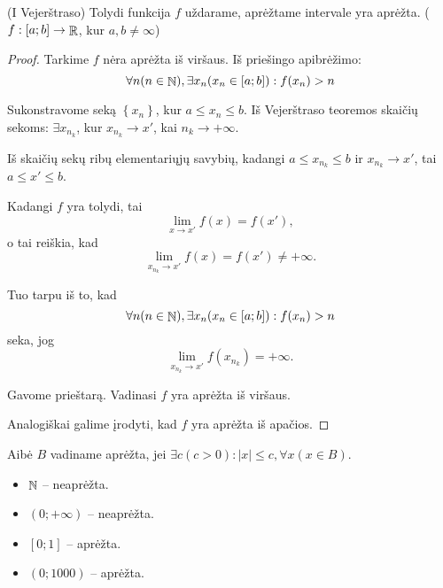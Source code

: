 \begin{prop}
  (I Vejerštraso) Tolydi funkcija $f$ uždarame, aprėžtame intervale yra
  aprėžta. ($f : [a;b] \to \mathop{\mathbb{R}}$, kur $a, b \neq \infty$)

  \begin{proof}
    Tarkime $f$ nėra aprėžta iš viršaus. Iš priešingo apibrėžimo:
    \begin{equation*}
      \forall n (n \in \mathop{\mathbb{N}}), \exists x_{n} (x_{n} \in [a;b]) :
        f(x_{n}) > n
    \end{equation*}

    Sukonstravome seką $\left\{ x_{n} \right\}$, kur 
    $a \leq x_{n} \leq b$. Iš Vejerštraso teoremos skaičių sekoms:
    $ \exists x_{n_{k}}$, kur $x_{n_{k}} \to x'$, 
    kai $n_{k} \to +\infty$.

    Iš skaičių sekų ribų elementariųjų savybių, kadangi 
    $a \leq x_{n_{k}} \leq b$ ir $x_{n_{k}} \to x'$, tai 
    $a \leq x' \leq b$.

    Kadangi $f$ yra tolydi, tai 
    \begin{equation*}
      \lim _{x \to x'} f(x) = f(x'),
    \end{equation*}
    o tai reiškia, kad
    \begin{equation*}
      \lim _{x_{n_{k}} \to x'} f(x) = f(x') \neq +\infty.
    \end{equation*}

    Tuo tarpu iš to, kad
    \begin{equation*}
      \forall n (n \in \mathop{\mathbb{N}}), \exists x_{n} (x_{n} \in [a;b]) :
        f(x_{n}) > n
    \end{equation*}
    seka, jog
    \begin{equation*}
      \lim _{x_{n_{k}} \to x'} f(x_{n_{k}}) = +\infty.
    \end{equation*}

    Gavome prieštarą. Vadinasi $f$ yra aprėžta iš viršaus. 

    Analogiškai galime įrodyti, kad $f$ yra aprėžta iš apačios.
  \end{proof}

\end{prop}

\begin{exmp}
  Aibė $B$ vadiname aprėžta, jei 
  $\exists c (c > 0) : |x| \leq c, \forall x (x \in B)$.
  \begin{itemize}
    \item $\mathop{\mathbb{N}}$ – neaprėžta.
    \item $(0; +\infty)$ – neaprėžta.
    \item $[0; 1]$ – aprėžta.
    \item $(0; 1000)$ – aprėžta.
  \end{itemize}
\end{exmp}

